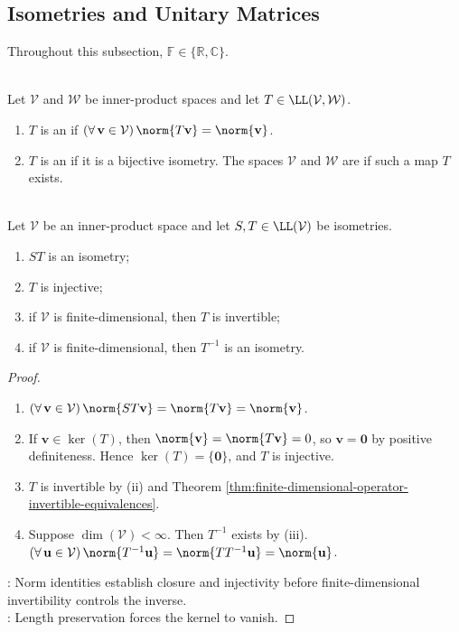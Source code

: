 \subsection{Isometries and Unitary Matrices}

Throughout this subsection, $\mathbb{F}\in\{\mathbb{R},\mathbb{C}\}$.

\begin{definition} \label{def:isometry-linear-map} \\
Let $\mathcal{V}$ and $\mathcal{W}$ be inner-product spaces and let $T\in\LL(\mathcal{V},\mathcal{W})$.
\begin{enumerate}[label=(\roman*)]
\setlength{\itemsep}{0pt}
\item $T$ is an  if $(\forall\,\mathbf{v}\in\mathcal{V})\,\norm{T\mathbf{v}}=\norm{\mathbf{v}}$.
\item $T$ is an  if it is a bijective isometry. The spaces $\mathcal{V}$ and $\mathcal{W}$ are  if such a map $T$ exists.
\end{enumerate}
\end{definition}

\begin{proposition} \label{prop:basic-isometry-properties} \\
Let $\mathcal{V}$ be an inner-product space and let $S,T\in\LL(\mathcal{V})$ be isometries.
\begin{enumerate}[label=(\roman*)]
\setlength{\itemsep}{0pt}
\item $ST$ is an isometry;
\item $T$ is injective;
\item if $\mathcal{V}$ is finite-dimensional, then $T$ is invertible;
\item if $\mathcal{V}$ is finite-dimensional, then $T^{-1}$ is an isometry.
\end{enumerate}
\begin{proof}
\begin{enumerate}[label=(\roman*)]
\setlength{\itemsep}{0pt}
\item $(\forall\,\mathbf{v}\in\mathcal{V})\,\norm{ST\mathbf{v}}=\norm{T\mathbf{v}}=\norm{\mathbf{v}}$.
\item If $\mathbf{v}\in\ker(T)$, then $\norm{\mathbf{v}}=\norm{T\mathbf{v}}=0$, so $\mathbf{v}=\mathbf{0}$ by positive definiteness. Hence $\ker(T)=\{\mathbf{0}\}$, and $T$ is injective.
\item $T$ is invertible by (ii) and Theorem \ref{thm:finite-dimensional-operator-invertible-equivalences}.
\item Suppose $\dim(\mathcal{V})<\infty$. Then $T^{-1}$ exists by (iii). $(\forall\,\mathbf{u}\in\mathcal{V})\,\norm{T^{-1}\mathbf{u}}=\norm{TT^{-1}\mathbf{u}}=\norm{\mathbf{u}}$.
\end{enumerate}
: Norm identities establish closure and injectivity before finite-dimensional invertibility controls the inverse.\\
: Length preservation forces the kernel to vanish.
\end{proof}
\end{proposition}

